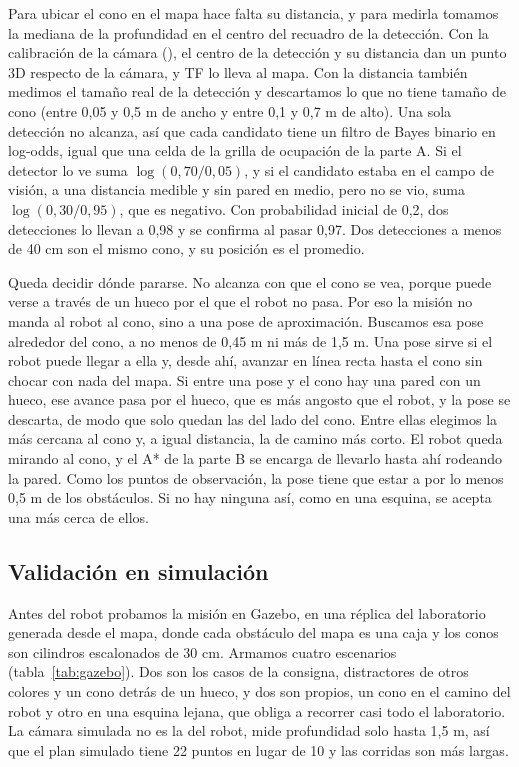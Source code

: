 Para ubicar el cono en el mapa hace falta su distancia, y para medirla tomamos la
mediana de la profundidad en el centro del recuadro de la detección. Con la
calibración de la cámara (), el centro de la detección y su
distancia dan un punto 3D respecto de la cámara, y TF lo lleva al mapa. Con la
distancia también medimos el tamaño real de la detección y descartamos lo que no tiene tamaño de cono (entre 0,05 y
0,5 m de ancho y entre 0,1 y 0,7 m de alto). Una sola detección no alcanza,
así que cada candidato tiene un filtro de Bayes binario en log-odds, igual que una
celda de la grilla de ocupación de la parte A. Si el detector lo ve suma
$\log(0{,}70/0{,}05)$, y si el candidato estaba en el campo de visión, a una
distancia medible y sin pared en medio, pero no se vio, suma
$\log(0{,}30/0{,}95)$, que es negativo. Con probabilidad inicial de 0,2, dos
detecciones lo llevan a 0,98 y se confirma al pasar 0,97. Dos detecciones a
menos de 40 cm son el mismo cono, y su posición es el promedio.

Queda decidir dónde pararse. No alcanza con que el cono se vea, porque puede verse a
través de un hueco por el que el robot no pasa. Por eso la misión no manda al
robot al cono, sino a una pose de aproximación. Buscamos esa pose alrededor
del cono, a no menos de 0,45 m ni más de 1,5 m. Una pose sirve si el robot
puede llegar a ella y, desde ahí, avanzar en línea recta hasta el cono sin
chocar con nada del mapa. Si entre una pose y el cono hay una pared con un
hueco, ese avance pasa por el hueco, que es más angosto que el robot, y la
pose se descarta, de modo que solo quedan las del lado del cono. Entre ellas elegimos la
más cercana al cono y, a igual distancia, la de camino más corto. El robot
queda mirando al cono, y el A* de la parte B se encarga de llevarlo hasta ahí
rodeando la pared. Como los puntos de observación, la pose tiene que estar a
por lo menos 0,5 m de los obstáculos. Si no hay ninguna así, como en una
esquina, se acepta una más cerca de ellos.

\subsection{Validación en simulación}

Antes del robot probamos la misión en Gazebo, en una réplica del laboratorio
generada desde el mapa, donde cada obstáculo del mapa es una caja y los conos son
cilindros escalonados de 30 cm. Armamos cuatro escenarios (tabla~\ref{tab:gazebo}).
Dos son los casos de la consigna, distractores de otros colores y un cono detrás
de un hueco, y dos son propios, un cono en el camino del robot y otro en una
esquina lejana, que obliga a recorrer casi todo el laboratorio. La cámara simulada no es la del
robot, mide profundidad solo hasta 1,5 m, así que el plan simulado tiene 22
puntos en lugar de 10 y las corridas son más largas.

